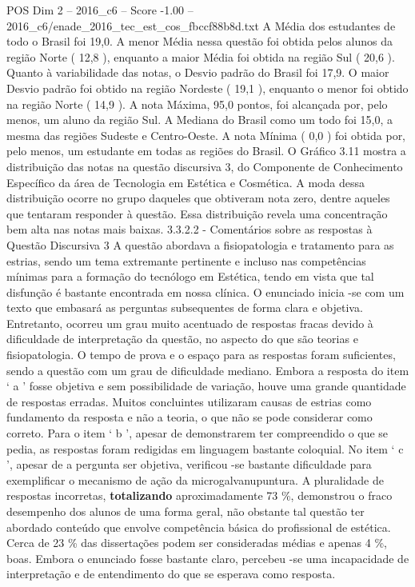 \begin{textsample}{POS Dim 2 – 2016\_c6 – Score -1.00 – 2016\_c6/enade\_2016\_tec\_est\_cos\_fbccf88b8d.txt}
A Média dos estudantes de todo o Brasil foi 19,0.
A menor Média nessa questão foi obtida pelos alunos da região Norte ( 12,8 ), enquanto a maior Média foi obtida na região Sul ( 20,6 ).
Quanto à variabilidade das notas, o Desvio padrão do Brasil foi 17,9.
O maior Desvio padrão foi obtido na região Nordeste ( 19,1 ), enquanto o menor foi obtido na região Norte ( 14,9 ).
A nota Máxima, 95,0 pontos, foi alcançada por, pelo menos, um aluno da região Sul.
A Mediana do Brasil como um todo foi 15,0, a mesma das regiões Sudeste e Centro-Oeste.
A nota Mínima ( 0,0 ) foi obtida por, pelo menos, um estudante em todas as regiões do Brasil.
O Gráfico 3.11 mostra a distribuição das notas na questão discursiva 3, do Componente de Conhecimento Específico da área de Tecnologia em Estética e Cosmética.
A moda dessa distribuição ocorre no grupo daqueles que obtiveram nota zero, dentre aqueles que tentaram responder à questão.
Essa distribuição revela uma concentração bem alta nas notas mais baixas. 3.3.2.2 - Comentários sobre as respostas à Questão Discursiva 3 A questão abordava a fisiopatologia e tratamento para as estrias, sendo um tema extremante pertinente e incluso nas competências mínimas para a formação do tecnólogo em Estética, tendo em vista que tal disfunção é bastante encontrada em nossa clínica.
O enunciado inicia -se com um texto que embasará as perguntas subsequentes de forma clara e objetiva.
Entretanto, ocorreu um grau muito acentuado de respostas fracas devido à dificuldade de interpretação da questão, no aspecto do que são teorias e fisiopatologia.
O tempo de prova e o espaço para as respostas foram suficientes, sendo a questão com um grau de dificuldade mediano.
Embora a resposta do item ‘ a ’ fosse objetiva e sem possibilidade de variação, houve uma grande quantidade de respostas erradas.
Muitos concluintes utilizaram causas de estrias como fundamento da resposta e não a teoria, o que não se pode considerar como correto.
Para o item ‘ b ’, apesar de demonstrarem ter compreendido o que se pedia, as respostas foram redigidas em linguagem bastante coloquial.
No item ‘ c ’, apesar de a pergunta ser objetiva, verificou -se bastante dificuldade para exemplificar o mecanismo de ação da microgalvanupuntura.
A pluralidade de respostas incorretas, \textbf{totalizando} aproximadamente 73 \%, demonstrou o fraco desempenho dos alunos de uma forma geral, não obstante tal questão ter abordado conteúdo que envolve competência básica do profissional de estética.
Cerca de 23 \% das dissertações podem ser consideradas médias e apenas 4 \%, boas.
Embora o enunciado fosse bastante claro, percebeu -se uma incapacidade de interpretação e de entendimento do que se esperava como resposta.

\end{textsample}
